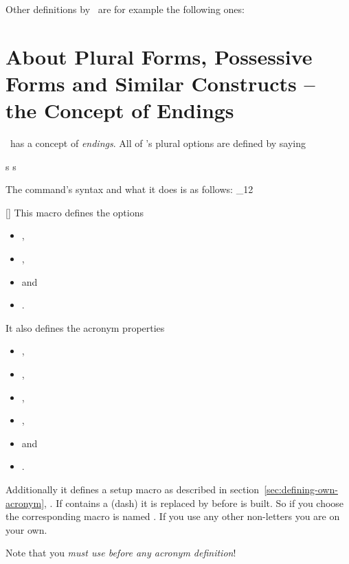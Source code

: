 \documentclass[load-preamble+]{cnltx-doc}
\makeatletter
\renewenvironment{commands}
  {%
    \cnltx@set@catcode_{12}%
    \let\command\cnltx@command
    \cnltxlist
  }
  {\endcnltxlist}
\makeatother
\begin{document}
Other definitions by \acro\ are for example the following ones:

\section{About Plural Forms, Possessive Forms and Similar Constructs -- the
  Concept of Endings}

\acro\ has a concept of \emph{endings}.  All of \acro's plural options are
defined by saying
\begin{sourcecode}
   {s} {s}
\end{sourcecode}
The command's syntax and what it does is as follows:
\begin{commands}
  \command{ProvideAcroEnding}[]
    This macro defines the options
    \begin{itemize}
      \item {},
      \item {},
      \item {} and
      \item {}.
    \end{itemize}
    It also defines the acronym properties
    \begin{itemize}
      \item {},
      \item {},
      \item {},
      \item {},
      \item {} and
      \item {}.
    \end{itemize}
    Additionally it defines a setup macro as
    described in section~\vref{sec:defining-own-acronym},
    .  If  contains a \code{-} (dash) it is
    replaced by \code{\_} before  is built.  So if you
    choose  the corresponding macro is named
    .  If you use any other non-letters you are on your
    own.

    Note that you \emph{must use  before any acronym
      definition}!
\end{commands}
\end{document}
